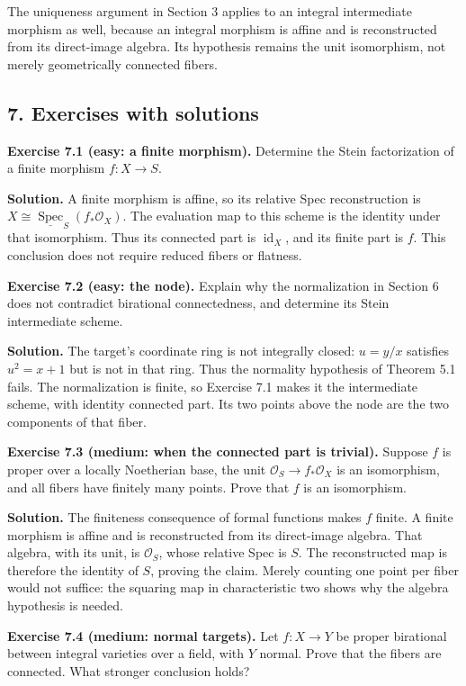 \documentclass[11pt]{article}
\begin{document}
The uniqueness argument in Section 3 applies to an integral intermediate
morphism as well, because an integral morphism is affine and is
reconstructed from its direct-image algebra. Its hypothesis remains the
unit isomorphism, not merely geometrically connected fibers.

\subsection{7. Exercises with solutions}\label{exercises-with-solutions}

\textbf{Exercise 7.1 (easy: a finite morphism).} Determine the Stein
factorization of a finite morphism \(f:X\to S\).

\textbf{Solution.} A finite morphism is affine, so its relative Spec
reconstruction is
\(X\cong\underline{\operatorname{Spec}}_S(f_*\mathcal O_X)\). The
evaluation map to this scheme is the identity under that isomorphism.
Thus its connected part is \(\operatorname{id}_X\), and its finite part
is \(f\). This conclusion does not require reduced fibers or flatness.

\textbf{Exercise 7.2 (easy: the node).} Explain why the normalization in
Section 6 does not contradict birational connectedness, and determine
its Stein intermediate scheme.

\textbf{Solution.} The target's coordinate ring is not integrally
closed: \(u=y/x\) satisfies \(u^2=x+1\) but is not in that ring. Thus
the normality hypothesis of Theorem 5.1 fails. The normalization is
finite, so Exercise 7.1 makes it the intermediate scheme, with identity
connected part. Its two points above the node are the two components of
that fiber.

\textbf{Exercise 7.3 (medium: when the connected part is trivial).}
Suppose \(f\) is proper over a locally Noetherian base, the unit
\(\mathcal O_S\to f_*\mathcal O_X\) is an isomorphism, and all fibers
have finitely many points. Prove that \(f\) is an isomorphism.

\textbf{Solution.} The finiteness consequence of formal functions makes
\(f\) finite. A finite morphism is affine and is reconstructed from its
direct-image algebra. That algebra, with its unit, is \(\mathcal O_S\),
whose relative Spec is \(S\). The reconstructed map is therefore the
identity of \(S\), proving the claim. Merely counting one point per
fiber would not suffice: the squaring map in characteristic two shows
why the algebra hypothesis is needed.

\textbf{Exercise 7.4 (medium: normal targets).} Let \(f:X\to Y\) be
proper birational between integral varieties over a field, with \(Y\)
normal. Prove that the fibers are connected. What stronger conclusion
holds?
\end{document}
